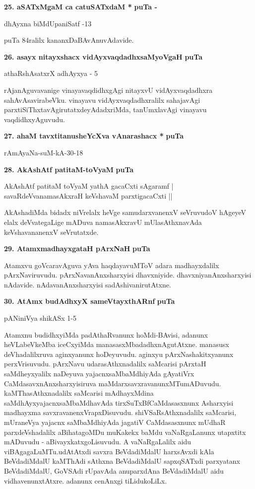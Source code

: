 \medskip
\noindent
\textbf{25. aSATxMgaM ca catuSATxdaM *} \hfill{\bf puTa \pageref{84}-\pageref{144}}

\hfill{dhAyxna biMdUpaniSatf -13}

puTa 84ralilx kananxDaBAvAnuvAdavide.

\eject

\noindent
\textbf{26. asayx nitayxshacx vidAyxvaqdadhxsaMyoVgaH} \hfill{\bf puTa \pageref{93}}

\hfill{athaRshAsatxrX adhAyxya - 5}

\smallskip
rAjanAguvavanige vinayavaqdidhxgAgi nitayxvU vidAyxvaqdadhxra sahAvAsavirabeVku. vinayavu vidAyx\-vaqdadhxralilx sahajavAgi parxtiSiThxtavAgirutatxdeyAdadxriMda, tanUmxlavAgi vinayavu vaqdidhxyAguvudu.

\medskip
\noindent
\textbf{27. ahaM tavxtitanusheYcXva vAnarashacx *} \hfill{\bf puTa \pageref{14}}

\hfill{rAmAyaNa-suM-kA-30-18}

\medskip
\noindent
\textbf{28. AkAshAtf patitaM-toVyaM} \hfill{\bf puTa \pageref{247}}

\begin{shloka}
AkAshAtf patitaM toVyaM yathA gacaCxti sAgaramf |\\
savaRdeVvanamasAkxraH keVshavaM parxtigacaCxti ||
\end{shloka}

AkAshadiMda bidadx niVrelalx heVge samudarxvanenxV seVruvudoV hAgeyeV elalx deVvategaLige mADuva namasAkxravU mUlasAthxnavAda keVshavananenxV seVrutatxde.

\smallskip
\noindent
\textbf{29. AtamxmadhayxgataH pArxNaH} \hfill{\bf puTa \pageref{152}}

Atamxvu goVcaravAguva yAva haqdayavuMToV adara madhayxdalilx pArxNa\-viruvudu. pArxNavanAnxsharx\-yisi dhavxniyide. dhavxniyanAnxsharxyisi nAdavide. nAdavanAnxsharxyisi sadAshivanirutAtxne. 

\medskip
\noindent
\textbf{30. AtAmx budAdhxyX sameVtayxthARnf} \hfill{\bf puTa \pageref{152}}

\hfill{pANiniVya shikASx 1-5}

\smallskip
Atamxnu budidhxyiMda padAthaRvanunx hoMdi-BAvisi, adanunx heVLabeVkeMba iceCxyiMda manasasxMba\-dadhxnAgutAtxne. manasusx deVhadalilxruva aginxyanunx hoDeyuvudu. aginxyu pArxNashakitxyanunx perxVrisu\-vudu. pArxNavu udarasAthxnadalilx saMcarisi pArxtaH saMdheyxyalilx naDeyuva yajacnxsaMbaMdhiyAda gAyatiVrx\- CaMdasavxnAnxsharxyi\break\-si\-ruva maMdarxsavxravanunxMTumADuvudu. kaMThasAthxnadalilx saMcarisi mAdhayxMdina saMdhAyx\-yajacnxsaMbaMdhavAda tirxSuTxBfCaMdasasxnunx Asharxyisi madhayxma savxravanenxVrapxDi\-su\-vudu. shiVSaRsAthxnadalilx saMca\-risi, mUraneVya yajacnx saMbaMdhiyAda jagatiV CaMdasasxnunx mUdhaR parxdeVshadalilx aBihata\-goMDu muKakekx baMdu vaNaRgaLanunx utapxtitx mADuvudu - aBivayxkatxgoLisuvudu. A vaNaRgaLalilx aidu viBAga\-gaLuMTu.\break udAtAtxdi savxra BeVdadiMdalU harxsAvxdi kAla BeVdadiMdalU kaMThAdi sAthxna BeVda\-diMdalU sapxqSATxdi parxyatanx BeVdadiMdalU, GoVSAdi rUpavAda anuparxdAna BeVdadiMdalU aidu vidhavenunx\-tAtxre. adanunx cenAnxgi tiLidukoLiLx.

